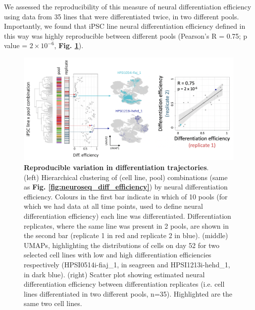 We assessed the reproducibility of this measure of neural differentiation efficiency using data from 35 lines that were differentiated twice, in two different pools. 
Importantly, we found that iPSC line neural differentiation efficiency defined in this way was highly reproducible between different pools (Pearson's R = 0.75; p value = $2 \times 10^{-6}$, \textbf{Fig. \ref{fig:neuroseq_diff_eff_replication}}).

\begin{figure}[h]
\centering
\includegraphics[width=15.5cm]{Chapter5/Fig/neuroseq_diff_eff_replication.png}
\caption[Reproducible neural differentiation efficiency]{\textbf{Reproducible variation in differentiation trajectories}.\\
(left) Hierarchical clustering of (cell line, pool) combinations (same as \textbf{Fig. \ref{fig:neuroseq_diff_efficiency}}) by neural differentiation efficiency. 
Colours in the first bar indicate in which of 10 pools (for which we had data at all time points, used to define neural differentiation efficiency) each line was differentiated. 
Differentiation replicates, where the same line was present in 2 pools, are shown in the second bar (replicate 1 in red and replicate 2 in blue).
(middle) UMAPs, highlighting the distributions of cells on day 52 for two selected cell lines with low and high differentiation efficiencies respectively (HPSI0514i-fiaj\_1, in seagreen and HPSI1213i-hehd\_1, in dark blue).
(right) Scatter plot showing estimated neural differentiation efficiency between differentiation replicates (i.e. cell lines differentiated in two different pools, n=35). 
Highlighted are the same two cell lines.}
\label{fig:neuroseq_diff_eff_replication}
\end{figure}


